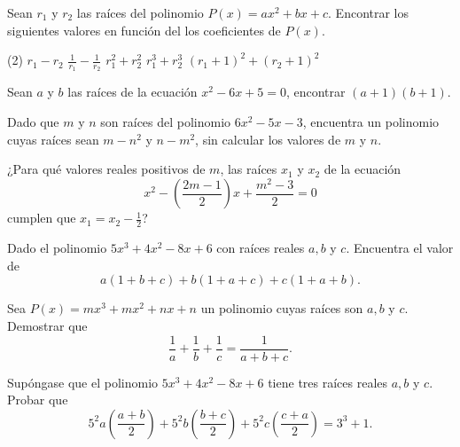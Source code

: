 \showLine
\begin{multicols}{2}

    \begin{exercise}
        Sean $r_1$ y $r_2$ las raíces del polinomio $P(x) = ax^2 + bx + c$.
        Encontrar los siguientes valores en función del los coeficientes de $P(x)$.
        \begin{tasks}[label=\roman*.](2)
            \task $r_1 - r_2$
            \task $\frac{1}{r_1} - \frac{1}{r_2}$
            \task $r^2_1 + r^2_2$
            \task $r^3_1 + r^3_2$
            \task $(r_1 + 1)^2 + (r_2 + 1)^2$
        \end{tasks}
    \end{exercise}

    \begin{problem}
        Sean $a$ y $b$ las raíces de la ecuación $x^2 - 6x + 5 = 0$, encontrar $(a + 1)(b + 1)$.
    \end{problem}

    \begin{problem}
        Dado que $m$ y $n$ son raíces del polinomio $6x^2 - 5x - 3$, encuentra un polinomio cuyas raíces sean
        $m - n^2$ y $n - m^2$, sin calcular los valores de $m$ y $n$.
    \end{problem}

    \begin{problem}
        ¿Para qué valores reales positivos de $m$, las raíces $x_1$ y $x_2$ de la ecuación
        \[
            x^2 - \left( \frac{2m - 1}{2} \right)x  + \frac{m^2 - 3}{2} = 0
        \]
        cumplen que $x_1 = x_2 - \frac{1}{2}$?
    \end{problem}

    \begin{problem}
        Dado el polinomio $5x^3 + 4x^2 - 8x + 6$ con raíces reales $a, b$ y $c$.
        Encuentra el valor de
        \[
            a(1 + b + c) + b(1 + a + c) + c(1 + a + b).
        \]
    \end{problem}

    \begin{problem}
        Sea $P(x) = mx^3 + mx^2 + nx + n$ un polinomio cuyas raíces son $a, b$ y $c$.
        Demostrar que
        \[
            \frac{1}{a} + \frac{1}{b} + \frac{1}{c} = \frac{1}{a + b + c}.
        \]
    \end{problem}

    \begin{problem}
        Supóngase que el polinomio $5x^3 + 4x^2 - 8x + 6$ tiene tres raíces reales $a, b$ y $c$.
        Probar que
        \[
            5^2 a \left(\frac{a + b}{2}\right) + 5^2 b \left(\frac{b + c}{2}\right) + 5^2 c \left(\frac{c + a}{2}\right) = 3^3 + 1.
        \]
    \end{problem}
\end{multicols}